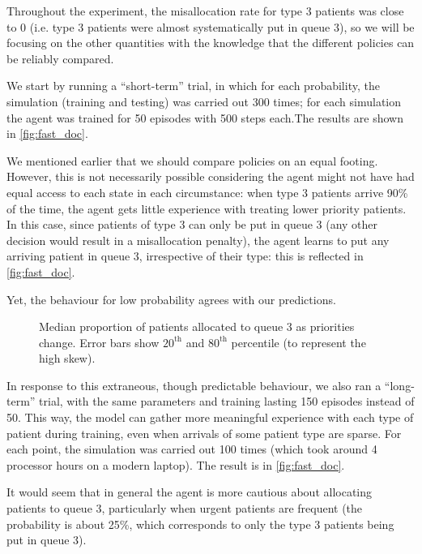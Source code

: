 \documentclass[11point]{article}
\begin{document}
Throughout the experiment, the misallocation rate for type 3 patients was close to 0 (i.e. type 3 patients were almost systematically put in queue 3), so we will be focusing on the other quantities with the knowledge that the different policies can be reliably compared.

We start by running a ``short-term'' trial, in which for each probability, the simulation (training and testing) was carried out 300 times; for each simulation the agent was trained for 50 episodes with 500 steps each.The results are shown in \autoref{fig:fast_doc}.

We mentioned earlier that we should compare policies on an equal footing. However, this is not necessarily possible considering the agent might not have had equal access to each state in each circumstance: when type 3 patients arrive 90\% of the time, the agent gets little experience with treating lower priority patients.
In this case, since patients of type 3 can only be put in queue 3 (any other decision would result in a misallocation penalty), the agent learns to put any arriving patient in queue 3, irrespective of their type: this is reflected in \autoref{fig:fast_doc}.

Yet, the behaviour for low probability agrees with our predictions.
\begin{figure}[H]
    \centering
    \resizebox{\columnwidth}{!}{
        
    }
    \caption{Median proportion of patients allocated to queue 3 as priorities change. Error bars show $20^\text{th}$ and $80^\text{th}$ percentile (to represent the high skew).}
    \label{fig:fast_doc}
\end{figure}

In response to this extraneous, though predictable behaviour, we also ran a ``long-term'' trial, with the same parameters and training lasting 150 episodes instead of 50.
This way, the model can gather more meaningful experience with each type of patient during training, even when arrivals of some patient type are sparse.
For each point, the simulation was carried out 100 times (which took around 4 processor hours on a modern laptop).
The result is in \autoref{fig:fast_doc}.

It would seem that in general the agent is more cautious about allocating patients to queue 3, particularly when urgent patients are frequent (the probability is about 25\%, which corresponds to only the type 3 patients being put in queue 3).
\end{document}
